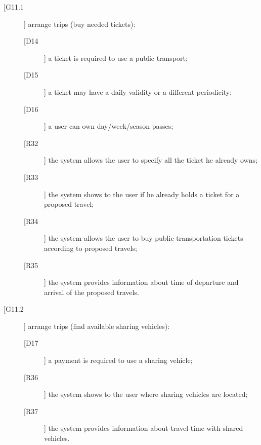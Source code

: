 \begin{description}
\item[[G11.1]] arrange trips (buy needed tickets):
	\begin{description}
	\item[[D14]] a ticket is required to use a public transport;
	\item[[D15]] a ticket may have a daily validity or a different periodicity;
	\item[[D16]] a user can own day/week/season passes;
	\newline
	\item[[R32]] the system allows the user to specify all the ticket he already owns;
	\item[[R33]] the system shows to the user if he already holds a ticket for a proposed travel;
	\item[[R34]] the system allows the user to buy public transportation tickets according to proposed travels;
	\item[[R35]] the system provides information about time of departure and arrival of the proposed travels.
	\end{description}
\item[[G11.2]] arrange trips (find available sharing vehicles):
	\begin{description}
	\item[[D17]] a payment is required to use a sharing vehicle;
	\newline
	\item[[R36]] the system shows to the user where sharing vehicles are located;
	\item[[R37]] the system provides information about travel time with shared vehicles.
	\end{description}
\end{description}